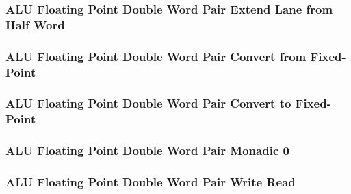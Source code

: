 

\subsubsection[{\small ALU Floating Point Double Word Pair Extend Lane from Half Word}]{ALU Floating Point Double Word Pair Extend Lane from Half Word} \label{sec:format-ALU-FDPEXTLWR}



\subsubsection[{\small ALU Floating Point Double Word Pair Convert from Fixed-Point}]{ALU Floating Point Double Word Pair Convert from Fixed-Point} \label{sec:format-ALU-FDPFLOAT}



\subsubsection[{\small ALU Floating Point Double Word Pair Convert to Fixed-Point}]{ALU Floating Point Double Word Pair Convert to Fixed-Point} \label{sec:format-ALU-FDPFIXED}



\subsubsection[{\small ALU Floating Point Double Word Pair Monadic 0}]{ALU Floating Point Double Word Pair Monadic 0} \label{sec:format-ALU-FDPMO0}



\subsubsection[{\small ALU Floating Point Double Word Pair Write Read}]{ALU Floating Point Double Word Pair Write Read} \label{sec:format-ALU-FDPWR}

